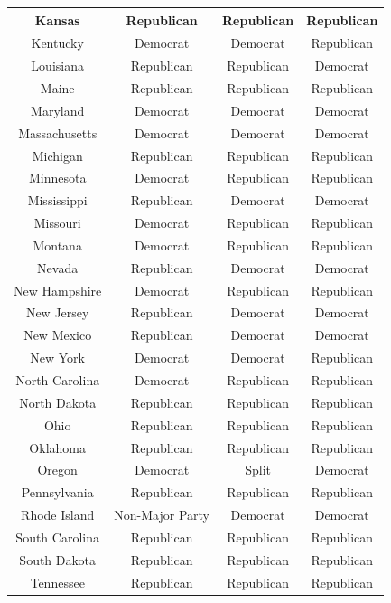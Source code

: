 \documentclass[]{book}
\theoremstyle{definition}
\theoremstyle{definition}
\theoremstyle{definition}
\theoremstyle{remark}
\begin{document}
\begin{enumerate}
\begin{table}[!h]
\begin{tabular}[t]{c|c|c|c}
  \hline
  Kansas & Republican & Republican & Republican\\
  \hline
  Kentucky & Democrat & Democrat & Republican\\
  \hline
  Louisiana & Republican & Republican & Democrat\\
  \hline
  Maine & Republican & Republican & Republican\\
  \hline
  Maryland & Democrat & Democrat & Democrat\\
  \hline
  Massachusetts & Democrat & Democrat & Democrat\\
  \hline
  Michigan & Republican & Republican & Republican\\
  \hline
  Minnesota & Democrat & Republican & Republican\\
  \hline
  Mississippi & Republican & Democrat & Democrat\\
  \hline
  Missouri & Democrat & Republican & Republican\\
  \hline
  Montana & Democrat & Republican & Republican\\
  \hline
  Nevada & Republican & Democrat & Democrat\\
  \hline
  New Hampshire & Democrat & Republican & Republican\\
  \hline
  New Jersey & Republican & Democrat & Democrat\\
  \hline
  New Mexico & Republican & Democrat & Democrat\\
  \hline
  New York & Democrat & Democrat & Republican\\
  \hline
  North Carolina & Democrat & Republican & Republican\\
  \hline
  North Dakota & Republican & Republican & Republican\\
  \hline
  Ohio & Republican & Republican & Republican\\
  \hline
  Oklahoma & Republican & Republican & Republican\\
  \hline
  Oregon & Democrat & Split & Democrat\\
  \hline
  Pennsylvania & Republican & Republican & Republican\\
  \hline
  Rhode Island & Non-Major Party & Democrat & Democrat\\
  \hline
  South Carolina & Republican & Republican & Republican\\
  \hline
  South Dakota & Republican & Republican & Republican\\
  \hline
  Tennessee & Republican & Republican & Republican\\

\end{tabular}
\end{table}
\end{enumerate}
\end{document}
